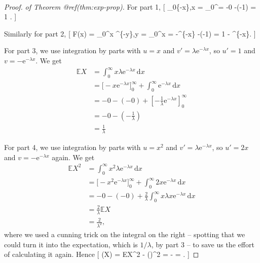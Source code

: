 \documentclass[
  letterpaper,
  DIV=11,
  numbers=noendperiod]{scrreprt}
\theoremstyle{remark}
\begin{document}
\begin{proof}

\emph{of Theorem @ref(thm:exp-prop).} For part 1, {[}
\int\_0\textsuperscript{\infty \lambda {}}\{-\lambda x\},x
= \_0\^{}\infty = -0 -(-1) = 1 . {]}

Similarly for part 2, {[} F(x) = \int\_0\^{}x
\lambda {}\^{}\{-\lambda y\},y =
\_0\^{}x =
-\^{}\{-\lambda x\} -(-1) = 1 - \^{}\{-\lambda x\}.
{]}

For part 3, we use integration by parts with \(u = x\) and
\(v' = \lambda \mathrm{e}^{-\lambda x}\), so \(u' = 1\) and
\(v = -\mathrm{e}^{-\lambda x}\). We get \begin{align*}
\mathbb EX &= \int_0^\infty x  \lambda \mathrm{e}^{-\lambda x}\,\mathrm{d}x \\
  &= \big[-x \mathrm{e}^{-\lambda x}\big]_0^\infty + \int_0^\infty \mathrm{e}^{-\lambda x}\,\mathrm{d}x \\
  &= -0 - (-0) + \left[ -\frac{1}{\lambda} \mathrm{e}^{-\lambda x} \right]_0^\infty \\
  &= -0 - \left(- \frac{1}{\lambda}\right) \\
  &= \frac{1}{\lambda}
\end{align*}

For part 4, we use integration by parts with \(u = x^2\) and
\(v' = \lambda \mathrm{e}^{-\lambda x}\), so \(u' = 2x\) and
\(v = -\mathrm{e}^{-\lambda x}\) again. We get \begin{align*}
\mathbb EX^2 &= \int_0^\infty x^2  \lambda \mathrm{e}^{-\lambda x}\,\mathrm{d}x \\
  &= \big[-x^2 \mathrm{e}^{-\lambda x}\big]_0^\infty + \int_0^\infty 2x \mathrm{e}^{-\lambda x}\,\mathrm{d}x \\
  &= -0 - (-0) + \frac{2}{\lambda} \int_0^\infty x  \lambda x \mathrm{e}^{-\lambda x}\,\mathrm{d}x \\
  &= \frac{2}{\lambda} \mathbb EX \\
  &= \frac{2}{\lambda^2} ,
\end{align*} where we used a cunning trick on the integral on the right
-- spotting that we could turn it into the expectation, which is
\(1/\lambda\), by part 3 -- to save us the effort of calculating it
again. Hence {[} \Var(X) = \mathbb EX\^{}2 -
\left(\right)\^{}2 =  -
 =  . {]}

\end{proof}
\end{document}

